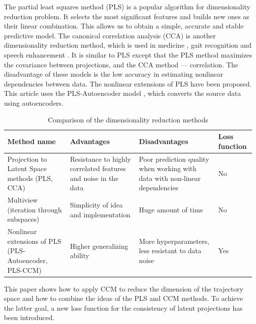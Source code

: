\documentclass[bst/sn-mathphys]{sn-jnl}%
\theoremstyle{thmstyleone}%
\theoremstyle{thmstyletwo}%
\theoremstyle{thmstylethree}%
\begin{document}
The partial least squares method (PLS) \cite{rosipal2005overview, sun2019application} is a popular algorithm for dimensionality reduction problem. It selects the most significant features and builds new ones as their linear combination.
This allows us to obtain a simple, accurate and stable predictive model.
The canonical correlation analysis (CCA) \cite{hardoon2004canonical} is another dimensionality reduction method, which is used in medicine \cite{sadoughi2016application}, gait recognition \cite{xing2016complete} and speech enhancement \cite{benesty2018canonical}. 
It is similar to PLS except that the PLS method maximizes the covariance between projections, and the CCA method — correlation.
The disadvantage of these models is the low accuracy in estimating nonlinear dependencies between data.
The nonlinear extensions of PLS \cite{qin1992nonlinear, rosipal2011nonlinear} have been proposed.
This article uses the PLS-Autoencoder model \cite{wiering2013neural}, which converts the source data using autoencoders.

\begingroup
\renewcommand{\arraystretch}{1.5}
\begin{table}[bhtp]
	\caption{Comparison of the dimensionality reduction methods}
	\label{tbl:dim_reduction_review}
	\begin{tabulary}{\textwidth}{L|L|L|L}
		\hline
		Method name & Advantages & Disadvantages & Loss function \\
		\hline
		Projection to Latent Space methods (PLS, CCA) & Resistance to
		highly correlated features and noise in the data & Poor prediction quality when working with data with non-linear dependencies & No \\
		\hline
		Multiview (iteration through subspaces) & Simplicity of idea and implementation & Huge amount of time & No\\
		\hline
		Nonlinear extensions of PLS (PLS-Autoencoder, PLS-CCM) & Higher generalizing ability & More hyperparameters, less resistant to data noise & Yes \\
		\hline
	\end{tabulary}
\end{table}
\endgroup

This paper shows how to apply CCM to reduce the dimension of the trajectory space and how to combine the ideas of the PLS and CCM methods.
To achieve the latter goal, a new loss function for the consistency of latent projections has been introduced.
\end{document}
